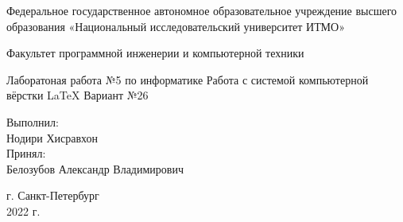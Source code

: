 \documentclass{memoir}
\begin{document}
\begin{center}
\begin{huge}

Федеральное государственное автономное образовательное учреждение\linebreak
высшего образования «Национальный исследовательский университет\linebreak
ИТМО»\linebreak


Факультет программной инженерии и компьютерной техники

\begin{vplace}[0.7]
Лаборатоная работа №5\linebreak
по информатике\linebreak
Работа с системой компьютерной вёрстки \LaTeX\linebreak
Вариант №26\linebreak
\end{vplace}

\begin{raggedleft}

Выполнил:\\
Нодири Хисравхон\\
Принял:\\
Белозубов Александр Владимирович\\

\end{raggedleft}

\vspace*{\fill}
г. Санкт-Петербург\\
2022 г.

\end{huge}
\end{center}
\end{document}
